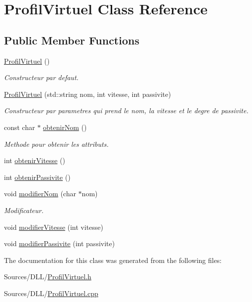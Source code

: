 \hypertarget{class_profil_virtuel}{}\section{Profil\+Virtuel Class Reference}
\label{class_profil_virtuel}
\subsection*{Public Member Functions}
\begin{DoxyCompactItemize}
\item 
\hyperlink{group__inf2990_ga0d0539c487d998663383f6fee4005e56}{Profil\+Virtuel} ()
\begin{DoxyCompactList}\small\item\em Constructeur par defaut. \end{DoxyCompactList}\item 
\hyperlink{group__inf2990_gab78b313efeeb5d5e15a37e6eff294858}{Profil\+Virtuel} (std\+::string nom, int vitesse, int passivite)
\begin{DoxyCompactList}\small\item\em Constructeur par parametres qui prend le nom, la vitesse et le degre de passivite. \end{DoxyCompactList}\item 
const char $\ast$ \hyperlink{group__inf2990_ga3591d820deebe252eb1adab7cb45d391}{obtenir\+Nom} ()
\begin{DoxyCompactList}\small\item\em Methode pour obtenir les attributs. \end{DoxyCompactList}\item 
int \hyperlink{group__inf2990_ga2e83621cae870eed63a7b1562ce9b82f}{obtenir\+Vitesse} ()
\item 
int \hyperlink{group__inf2990_ga55cdd04bf9debcb1e7de5cadd6738035}{obtenir\+Passivite} ()
\item 
void \hyperlink{group__inf2990_gab610c29426ac315225855113b169ad88}{modifier\+Nom} (char $\ast$nom)
\begin{DoxyCompactList}\small\item\em Modificateur. \end{DoxyCompactList}\item 
void \hyperlink{group__inf2990_gae1c14af7a00df22248697fada6a288d1}{modifier\+Vitesse} (int vitesse)
\item 
void \hyperlink{group__inf2990_ga570f9ced30e64955dd433d06829434ee}{modifier\+Passivite} (int passivite)
\end{DoxyCompactItemize}


The documentation for this class was generated from the following files\+:\begin{DoxyCompactItemize}
\item 
Sources/\+D\+L\+L/\hyperlink{_profil_virtuel_8h}{Profil\+Virtuel.\+h}\item 
Sources/\+D\+L\+L/\hyperlink{_profil_virtuel_8cpp}{Profil\+Virtuel.\+cpp}\end{DoxyCompactItemize}
